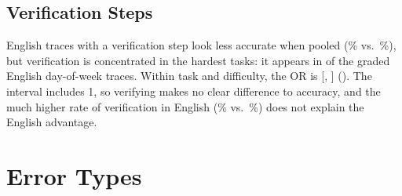 \subsection{Verification Steps}
\label{app:verification}

English traces with a verification step look less accurate when pooled (\VerAccWith{}\% vs.\ \VerAccWithout{}\%), but verification is concentrated in the hardest tasks: it appears in \VerDowN{} of the \VerDowTotal{} graded English day-of-week traces. Within task and difficulty, the OR is \VerOR{} [\VerORLo{}, \VerORHi{}] (\VerP{}). The interval includes 1, so verifying makes no clear difference to accuracy, and the much higher rate of verification in English (\EnVerification{}\% vs.\ \HiVerification{}\%) does not explain the English advantage.

\section{Error Types}
\label{app:errors}


